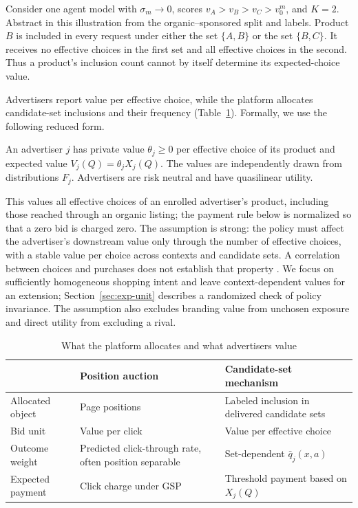 \documentclass[opre,dblanonrev]{informs4}
\providecommand{\1}{\mathbf{1}}
\begin{document}
\begin{example}\label{ex:inclusion}
Consider one agent model with $\sigma_m\to0$, scores $v_A>v_B>v_C>v_0^m$, and $K=2$. Abstract in this illustration from the organic--sponsored split and labels. Product $B$ is included in every request under either the set $\{A,B\}$ or the set $\{B,C\}$. It receives no effective choices in the first set and all effective choices in the second. Thus a product's inclusion count cannot by itself determine its expected-choice value.
\end{example}

Advertisers report value per effective choice, while the platform allocates candidate-set inclusions and their frequency (Table~\ref{tab:model-unit}). Formally, we use the following reduced form.
\begin{assumption}\label{ass:value}
An advertiser $j$ has private value $\theta_j\ge0$ per effective choice of its product and expected value $V_j(Q)=\theta_j X_j(Q)$. The values are independently drawn from distributions $F_j$. Advertisers are risk neutral and have quasilinear utility.
\end{assumption}

This values all effective choices of an enrolled advertiser's product, including those reached through an organic listing; the payment rule below is normalized so that a zero bid is charged zero. The assumption is strong: the policy must affect the advertiser's downstream value only through the number of effective choices, with a stable value per choice across contexts and candidate sets. A correlation between choices and purchases does not establish that property \citep{prentice1989surrogate,athey2026surrogate,chen2007criteria}. We focus on sufficiently homogeneous shopping intent and leave context-dependent values for an extension; Section~\ref{sec:exp-unit} describes a randomized check of policy invariance. The assumption also excludes branding value from unchosen exposure and direct utility from excluding a rival.

\begin{table}[htbp]
\centering\small
\caption{What the platform allocates and what advertisers value}\label{tab:model-unit}
\begin{tabularx}{\textwidth}{@{}>{\raggedright\arraybackslash}p{}>{\raggedright\arraybackslash}X>{\raggedright\arraybackslash}X@{}}
\toprule
& Position auction & Candidate-set mechanism \\
\midrule
Allocated object & Page positions & Labeled inclusion in delivered candidate sets \\
Bid unit & Value per click & Value per effective choice \\
Outcome weight & Predicted click-through rate, often position separable & Set-dependent $\bar q_j(x,a)$ \\
Expected payment & Click charge under GSP & Threshold payment based on $X_j(Q)$ \\
\bottomrule
\end{tabularx}
\end{table}
\end{document}

